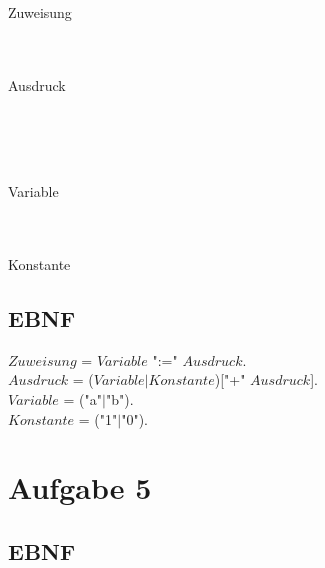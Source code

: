 \documentclass[11pt]{article} %
\begin{document}
Zuweisung\\
\begin{Syntaxdiagramm}%
\end{Syntaxdiagramm}
\\\\
Ausdruck\\
\begin{Syntaxdiagramm}%
	\begin{Alternativen}
	{}%
	{}%
	\\%
	\end{Alternativen}
\end{Syntaxdiagramm}
\\\\
Variable\\
\begin{Syntaxdiagramm}%
	\begin{Alternativen}
	{}%
	{}%
	\end{Alternativen}
\end{Syntaxdiagramm}
\\\\
Konstante\\
\begin{Syntaxdiagramm}%
	\begin{Alternativen}
	{}%
	{}%
	\end{Alternativen}
\end{Syntaxdiagramm}

\subsection{EBNF}

$Zuweisung$ = $Variable$ ":=" $Ausdruck$.\\
$Ausdruck$ = ($Variable|Konstante$)["+" $Ausdruck$].\\
$Variable$ = ("a"$|$"b").\\
$Konstante$ = ("1"$|$"0").\\

\newpage

\section{Aufgabe 5}

\subsection{EBNF}
\end{document}
